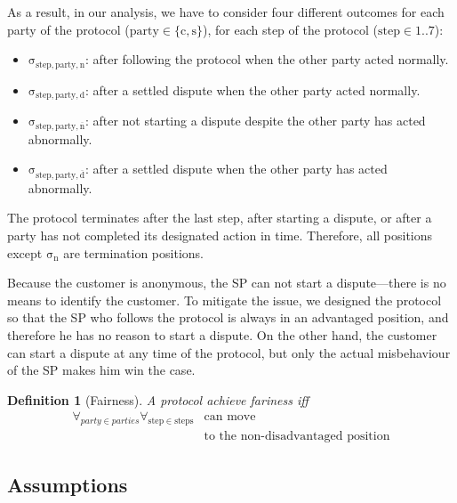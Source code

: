 \documentclass{ieeeaccess}
\newtheorem{definition}{Definition}
\begin{document}
As a result, in our analysis, we have to consider four different outcomes for each party of the protocol ($\mathrm{party \in \{c, s}\}$), for each step of the protocol ($\mathrm{step \in 1..7}$):

\begin{itemize}

\item
  $\mathrm{\sigma_{step,party,n}}$: after following the protocol when the other party acted normally.
\item
  $\mathrm{\sigma_{step,party,d}}$: after a settled dispute when the other party acted normally.
\item
  $\mathrm{\sigma_{step,party,\overline{n}}}$: after not starting a dispute despite the other party has acted abnormally.
\item
  $\mathrm{\sigma_{step,party,\overline{d}}}$: after a settled dispute when the other party has acted abnormally.
\end{itemize}



The protocol terminates after the last step, after starting a dispute, or after a party has not completed its designated action in time. Therefore, all positions except $\mathrm{\sigma_n}$ are termination positions.

Because the customer is anonymous, the SP can not start a dispute—there is no means to identify the customer. To mitigate the issue, we designed the protocol so that the SP who follows the protocol is always in an advantaged position, and therefore he has no reason to start a dispute. On the other hand, the customer can start a dispute at any time of the protocol, but only the actual misbehaviour of the SP makes him win the case.

\begin{definition}[Fairness] \label{def:fairness}
A protocol achieve fariness iff 
\begin{equation*}
\begin{split}
\forall_{party \in parties}\forall_{\mathrm{step} \in \mathrm{steps}} &\operatorname{can\ move}\\
&\operatorname{to\ the\ non-disadvantaged\ position} 
\end{split}
\end{equation*}

\end{definition}


\subsection{Assumptions}\label{assumptions}
\end{document}
